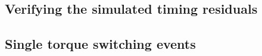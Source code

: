 \documentclass[/home/greg/Thesis/main/main.tex]{subfiles}
\begin{document}
\subsection{Verifying the simulated timing residuals}


\FloatBarrier
\subsection{Single torque switching events}


\biblio
\end{document}
